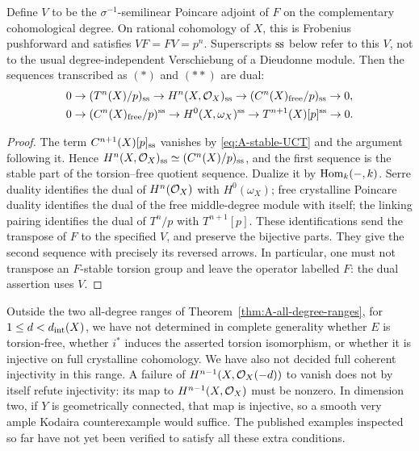 \begin{proposition}\label{prop:A-star-dual}
 Define $V$ to be
the $\sigma^{-1}$-semilinear Poincare adjoint of $F$ on the
complementary cohomological degree.  On rational cohomology of $X$,
this is Frobenius pushforward and satisfies $VF=FV=p^n$.
Superscripts ${\ss}$ below refer to this $V$, not to the usual
degree-independent Verschiebung of a Dieudonne module.  Then the
sequences transcribed as $(*)$ and $(**)$ are dual:
\begin{align*}
0&\to(T^n(X)/p)_{\ss}\to H^n(X,\OO_X)_{\ss}
 \to(C^n(X)_{\rm free}/p)_{\ss}\to0,\\
0&\to(C^n(X)_{\rm free}/p)^{\ss}\to
 H^0(X,\omega_X)^{\ss}\to T^{n+1}(X)[p]^{\ss}\to0.
\end{align*}
\end{proposition}
\begin{proof}
The term $C^{n+1}(X)[p]_{\ss}$ vanishes by
\eqref{eq:A-stable-UCT} and the argument following it.  Hence
$H^n(X,\OO_X)_{\ss}\simeq(C^n(X)/p)_{\ss}$, and the first sequence
is the stable part of the torsion--free quotient sequence.
Dualize it by $\Hom_k(-,k)$.  Serre duality identifies the dual of
$H^n(\OO_X)$ with $H^0(\omega_X)$; free crystalline Poincare duality
identifies the dual of the free middle-degree module with itself;
the linking pairing identifies the dual of $T^n/p$ with
$T^{n+1}[p]$.  These identifications send the transpose of $F$ to
the specified $V$, and preserve the bijective parts.  They give the
second sequence with precisely its reversed arrows.  In particular,
one must not transpose an $F$-stable torsion group and leave the
operator labelled $F$: the dual assertion uses $V$.
\end{proof}

\begin{question}\label{open:A-small-degree}
 Outside the two all-degree
ranges of Theorem~\ref{thm:A-all-degree-ranges}, for
$1\leq d<d_{\rm int}(X)$,
we have not determined in complete generality whether $E$ is
torsion-free, whether $i^*$ induces the asserted torsion isomorphism,
or whether it is injective on full crystalline cohomology.  We have
also not decided full coherent injectivity in this range.  A failure
of $H^{n-1}(X,\OO_X(-d))$ to vanish does not by itself refute
injectivity: its map to $H^{n-1}(X,\OO_X)$ must be nonzero.  In
dimension two, if $Y$ is geometrically connected, that map is
injective, so a smooth very ample Kodaira counterexample would
suffice.  The published examples inspected so far have not yet been
verified to satisfy all these extra conditions.
\end{question}
